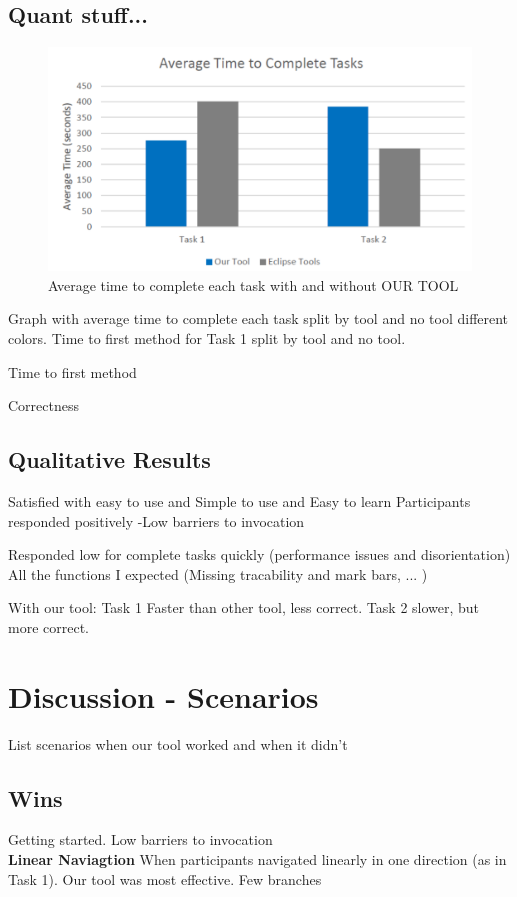 \documentclass[conference]{IEEEtran}
\newcommand{\toolName}{OUR TOOL}
\begin{document}
\subsection{Quant stuff...}


\begin{figure}
	\centering
	\includegraphics[width=\columnwidth]{images/taskTime}
	\caption{Average time to complete each task with and without \toolName}
	\label{fig:taskTime} 
\end{figure}

Graph with average time to complete each task split by tool and no tool different colors.
Time to first method for Task 1 split by tool and no tool.

Time to first method

Correctness

\subsection{Qualitative Results} 
Satisfied with easy to use	and Simple to use and Easy to learn Participants responded positively
-Low barriers to invocation

Responded low for complete tasks quickly (performance issues and disorientation)
All the functions I expected (Missing tracability and mark bars, ... )

With our tool: Task 1 Faster than other tool, less correct. Task 2 slower, but more correct. 


\section{Discussion - Scenarios}
List scenarios when our tool worked and when it didn't
\subsection{Wins}
Getting started. Low barriers to invocation
\\
\textbf{Linear Naviagtion}
When participants navigated linearly in one direction (as in Task 1). Our tool was most effective. 
Few branches
\end{document}
